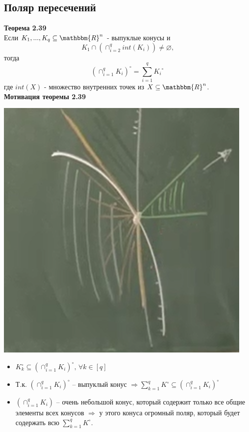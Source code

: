 \subsection{Поляр пересечений}
\noindent\textbf{Теорема 2.39}\\
Если $K_1, . . . , K_{q} \subseteq \mathbbm{R}^{n}$ - выпуклые конусы и
\begin{equation*} \tag{1}
 K_1 \cap \left(\cap_{i=2}^{q} int(K_{i})\right) \neq \varnothing \text{,}
\end{equation*}
тогда
\begin{equation*} \tag{2}
 \left(\cap_{i=1}^{q}{K_{i}}\right)^{\circ} = \sum_{i=1}^{q}{K_i}^{\circ}
\end{equation*}
где $int(X)$ - множество внутренних точек из $X\subseteq\mathbbm{R}^{n}$.\\
\textbf{Мотивация теоремы 2.39}
\begin{center}
\includegraphics[scale=0.5]{image21.png}
\end{center}
\begin{itemize}
\item $K_{k}^{\circ} \subseteq \left(\cap_{i=1}^{q} K_{i}\right)^{\circ}\text{, } \forall k \in \left[ q \right]$
\item Т.к. $\left(\cap_{i=1}^{q} K_{i}\right)^{\circ}$ -- выпуклый конус $\Longrightarrow \sum_{k=1}^{q} K^{\circ} \subseteq \left(\cap_{i=1}^{q} K_{i}\right)^{\circ}$
\item $\left(\cap_{i=1}^{q} K_{i}\right)$ -- очень небольшой конус, который содержит только все общие элементы всех конусов $\Longrightarrow$ у этого конуса огромный поляр, который будет содержать всю $\sum_{k=1}^{q} K^{\circ}$.
\end{itemize}
